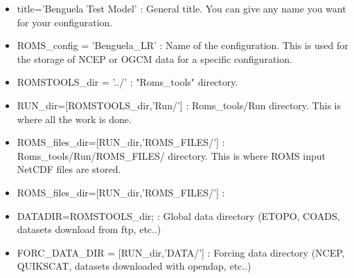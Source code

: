 \begin{itemize}
\item title='Benguela Test Model' : General title. You can give any name 
you want for your configuration.
\item ROMS\_config = 'Benguela\_LR' : Name of the configuration. This is used for the storage of
NCEP or OGCM data for a specific configuration.
\item ROMSTOOLS\_dir = '../' : "Roms\_tools" directory.
\item RUN\_dir=[ROMSTOOLS\_dir,'Run/'] : Roms\_tools/Run directory. This is where all 
the work is done.
\item ROMS\_files\_dir=[RUN\_dir,'ROMS\_FILES/'] : Roms\_tools/Run/ROMS\_FILES/ directory.
This is where ROMS input NetCDF files are stored.
\item ROMS\_files\_dir=[RUN\_dir,'ROMS\_FILES/'] : 
\item DATADIR=ROMSTOOLS\_dir;  : Global data directory (ETOPO, COADS, datasets download from ftp, etc..)
\item FORC\_DATA\_DIR = [RUN\_dir,'DATA/'] :  Forcing data directory (NCEP, QUIKSCAT, datasets downloaded with opendap, etc..)


\end{itemize}
